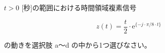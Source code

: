 $t > 0$ [秒]の範囲における時間領域複素信号 

\[
z(t) = \frac{t}{2} \cdot \textrm{e}^{\{-j \cdot \pi/8 \cdot t\}}
\]

\medskip
\noindent の動きを選択肢 a〜d の中から1つ選びなさい。
